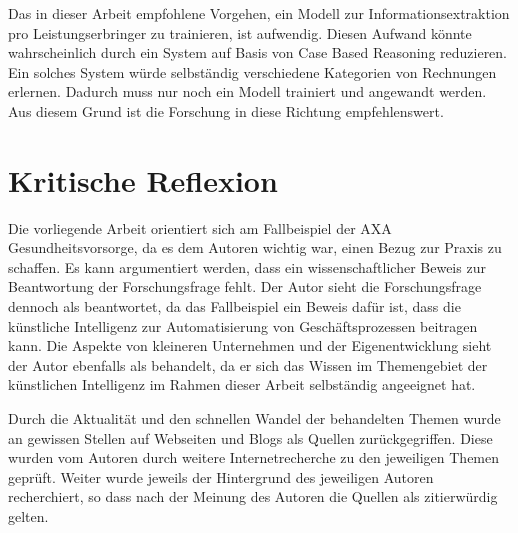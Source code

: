 Das in dieser Arbeit empfohlene Vorgehen, ein Modell zur Informationsextraktion pro Leistungserbringer zu trainieren, ist aufwendig. Diesen Aufwand könnte wahrscheinlich durch ein System auf Basis von Case Based Reasoning reduzieren. Ein solches System würde selbständig verschiedene Kategorien von Rechnungen erlernen. Dadurch muss nur noch ein Modell trainiert und angewandt werden. Aus diesem Grund ist die Forschung in diese Richtung empfehlenswert.

\section{Kritische Reflexion}
\label{chap:reflexion}

Die vorliegende Arbeit orientiert sich am Fallbeispiel der AXA Gesundheitsvorsorge, da es dem Autoren wichtig war, einen Bezug zur Praxis zu schaffen. Es kann argumentiert werden, dass ein wissenschaftlicher Beweis zur Beantwortung der Forschungsfrage fehlt. Der Autor sieht die Forschungsfrage dennoch als beantwortet, da das Fallbeispiel ein Beweis dafür ist, dass die künstliche Intelligenz zur Automatisierung von Geschäftsprozessen beitragen kann. Die Aspekte von kleineren Unternehmen und der Eigenentwicklung sieht der Autor ebenfalls als behandelt, da er sich das Wissen im Themengebiet der künstlichen Intelligenz im Rahmen dieser Arbeit selbständig angeeignet hat.

Durch die Aktualität und den schnellen Wandel der behandelten Themen wurde an gewissen Stellen auf Webseiten und Blogs als Quellen zurückgegriffen. Diese wurden vom Autoren durch weitere Internetrecherche zu den jeweiligen Themen geprüft. Weiter wurde jeweils der Hintergrund des jeweiligen Autoren recherchiert, so dass nach der Meinung des Autoren die Quellen als zitierwürdig gelten.